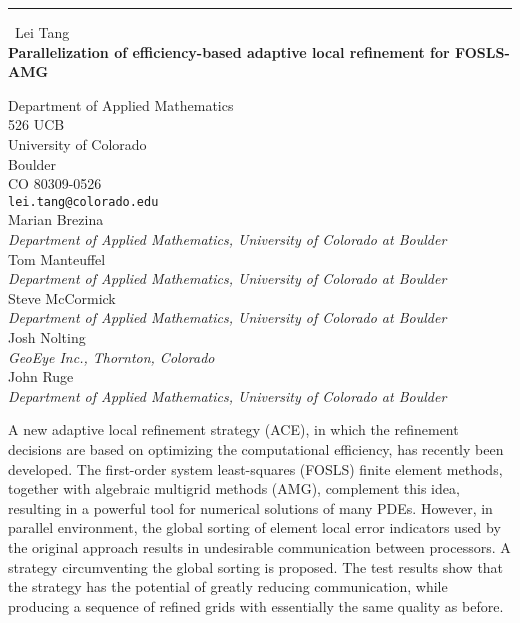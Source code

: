 \documentclass{report}
\begin{document}
\begin{center}
\rule{6in}{1pt} \
{\large Lei Tang \\
{\bf Parallelization of efficiency-based adaptive local refinement for FOSLS-AMG}}

Department of Applied Mathematics \\ 526 UCB \\ University of Colorado \\ Boulder \\ CO 80309-0526
\\
{\tt lei.tang@colorado.edu}\\
Marian Brezina\\
{\em Department of Applied Mathematics,
University of Colorado at Boulder}\\
Tom Manteuffel\\
{\em Department of Applied Mathematics,
University of Colorado at Boulder}\\
Steve McCormick\\
{\em Department of Applied Mathematics,
University of Colorado at Boulder}\\
Josh Nolting\\
{\em GeoEye Inc., Thornton, Colorado}\\
John Ruge\\
{\em Department of Applied Mathematics,
University of Colorado at Boulder}\end{center}

A new adaptive local refinement strategy (ACE), in which the refinement
decisions are based on optimizing the
computational efficiency, has recently been developed. The first-order
system least-squares (FOSLS) finite
element methods, together with algebraic multigrid methods (AMG),
complement this idea, resulting in a powerful tool for numerical
solutions of many PDEs. However, in parallel environment, the global
sorting of element local error indicators used by the original approach
results in undesirable communication between processors. A strategy
circumventing the global sorting is proposed. The test results show that
the strategy has the potential of greatly reducing communication, while
producing a sequence of refined grids with essentially the same quality
as before.
\end{document}
